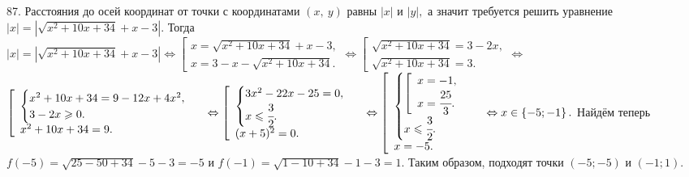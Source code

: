 87. Расстояния до осей координат от точки с координатами $(x,\ y)$ равны $|x|$ и $|y|,$ а значит требуется решить уравнение $|x|=|\sqrt{x^2+10x+34}+x-3|.$ Тогда $|x|=|\sqrt{x^2+10x+34}+x-3|\Leftrightarrow \left[\begin{array}{l} x=\sqrt{x^2+10x+34}+x-3,\\ x=3-x-\sqrt{x^2+10x+34}.\end{array}\right.\Leftrightarrow \left[\begin{array}{l} \sqrt{x^2+10x+34}=3-2x,\\ \sqrt{x^2+10x+34}=3.\end{array}\right.\Leftrightarrow$\\$ \left[\begin{array}{l} \begin{cases} x^2+10x+34=9-12x+4x^2,\\ 3-2x\geqslant0.\end{cases}\\ x^2+10x+34=9.\end{array}\right.\Leftrightarrow \left[\begin{array}{l} \begin{cases} 3x^2-22x-25=0,\\ x\leqslant\cfrac{3}{2}.\end{cases}\\ (x+5)^2=0.\end{array}\right.\Leftrightarrow \left[\begin{array}{l} \begin{cases} \left[\begin{array}{l} x=-1,\\ x=\cfrac{25}{3}.\end{array}\right.\\ x\leqslant\cfrac{3}{2}.\end{cases}\\ x=-5.\end{array}\right.\Leftrightarrow x\in\left\{-5;-1\right\}.$
Найдём теперь $f(-5)=\sqrt{25-50+34}-5-3=-5$ и $f\left(-1\right)=\sqrt{1-10+34}-1-3=1.$
Таким образом, подходят точки $(-5; -5)$ и $\left(-1;1\right).$\\
